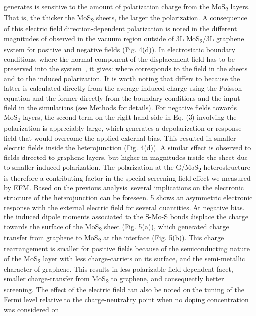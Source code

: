 generates is sensitive to the amount of polarization charge from the
MoS\textsubscript{2} layers. That is, the thicker the MoS\textsubscript{2} sheets, the larger the
polarization. A consequence of this electric field direction-dependent
polarization is noted in the different magnitudes of observed in the
vacuum region outside of 3L MoS\textsubscript{2}/3L graphene system for positive and
negative fields (Fig. 4(d)).  In electrostatic boundary conditions,
where the normal component of the displacement field has to be
preserved into the system~\cite{Meyer_2001_dipole_slab}, it gives:
where corresponds to the field in the sheets and to the induced
polarization.  It is worth noting that differs to because the latter
is calculated directly from the average induced charge using the
Poisson equation and the former directly from the boundary conditions
and the input field in the simulations (see Methods for details). For
negative fields towards MoS\textsubscript{2} layers, the second term on the right-hand
side in Eq. (3) involving the polarization is appreciably large, which
generates a depolarization or response field that would overcome the
applied external bias. This resulted in smaller electric fields inside
the heterojunction (Fig. 4(d)). A similar effect is observed to fields
directed to graphene layers, but higher in magnitudes inside the sheet
due to smaller induced polarization. The polarization at the G/MoS\textsubscript{2}
heterostructure is therefore a contributing factor in the special
screening field effect we measured by EFM.  Based on the previous
analysis, several implications on the electronic structure of the
heterojunction can be foreseen.  5 shows an asymmetric
electronic response with the external electric field for several
quantities. At negative bias, the induced dipole moments associated to
the S-Mo-S bonds displace the charge towards the surface of the MoS\textsubscript{2}
sheet (Fig. 5(a)), which generated charge transfer from graphene to
MoS\textsubscript{2} at the interface (Fig. 5(b)). This charge rearrangement is
smaller for positive fields because of the semiconducting nature of
the MoS\textsubscript{2} layer with less charge-carriers on its surface, and the
semi-metallic character of graphene. This results in less polarizable
field-dependent facet, smaller charge-transfer from MoS\textsubscript{2} to graphene,
and consequently better screening. The effect of the electric field
can also be noted on the tuning of the Fermi level relative to the
charge-neutrality point when no doping concentration was considered on
